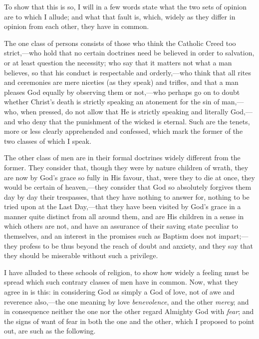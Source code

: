 To show that this is so, I will in a few words state what the two
sets of opinion are to which I allude; and what that fault is, which,
widely as they differ in opinion from each other, they have in common.

The one class of persons consists of those who think the Catholic
Creed too strict,—who hold that no certain doctrines need be
believed in order to salvation, or at least question the necessity;
who say that it matters not what a man believes, so that his conduct
is respectable and orderly,—who think that all rites and ceremonies
are mere niceties (as they speak) and trifles, and that a man pleases
God equally by observing them or not,—who perhaps go on to doubt
whether Christ's death is strictly speaking an atonement for the sin
of man,—who, when pressed, do not allow that He is strictly speaking
and literally God,—and who deny that the punishment of the wicked is
eternal. Such are the tenets, more or less clearly apprehended and
confessed, which mark the former of the two classes of which I speak.

The other class of men are in their formal doctrines widely
different from the former. They consider that, though they were by
nature children of wrath, they are now by God's grace so fully in His
favour, that, were they to die at once, they would be certain of
heaven,—they consider that God so absolutely forgives them day by
day their trespasses, that they have nothing to answer for, nothing to
be tried upon at the Last Day,—that they have been visited by God's
grace in a manner quite distinct from all around them, and are His
children in a sense in which others are not, and have an assurance of
their saving state peculiar to themselves, and an interest in the
promises such as Baptism does not impart;—they profess to be thus
beyond the reach of doubt and anxiety, and they say that they should
be miserable without such a privilege.

I have alluded to these schools of religion, to show how widely a
feeling must be spread which such contrary classes of men have in
common. Now, what they agree in is this: in considering God as simply
a God of love, not of awe and reverence also,—the one meaning by
love \emph{benevolence}, and the other \emph{mercy}; and in
consequence neither the one nor the other regard Almighty God with \emph{fear};
and the signs of want of fear in both the one and the other, which I
proposed to point out, are such as the following.

